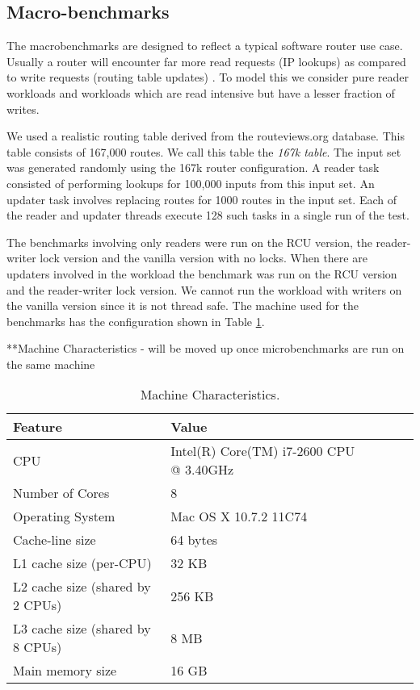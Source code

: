 \subsection{Macro-benchmarks}


The macrobenchmarks are designed to reflect a typical software
router use case. Usually a router will encounter far more read requests
(IP lookups) as compared to write requests (routing table updates)
. To model this we consider pure reader workloads and workloads which are read
intensive but have a lesser fraction of writes.

We used a realistic routing table derived from the routeviews.org
database. This table consists of 167,000 routes. We call this table
the \emph{167k table}. The input set was generated randomly using the 167k router configuration. A reader task consisted of performing lookups for 100,000 inputs from this input set. An updater task involves replacing routes for 1000 routes in the input set. Each of the reader and updater threads execute 128 such tasks in a single run of the test.


 The benchmarks involving only readers were run on the RCU version,
 the reader-writer lock version and the vanilla version with no
 locks. When there are updaters involved in the workload the benchmark was run on the RCU version and the reader-writer lock version. We cannot run the workload with writers on the vanilla version since it is not thread safe.  The machine used for the benchmarks has the configuration shown in Table
 \ref{tbl:machinemac}.


**Machine Characteristics - will be moved up once microbenchmarks are
run on the same machine

\begin{table}
\begin{center}
\begin{tabular}{|l|l|l|l|l|l|}
\hline Feature & Value\\
\hline CPU &Intel(R) Core(TM) i7-2600 CPU @ 3.40GHz\\
\hline Number of Cores & 8\\
\hline Operating System & Mac OS X 10.7.2 11C74\\
\hline Cache-line size & 64 bytes\\
\hline L1 cache size (per-CPU) & 32 KB\\
\hline L2 cache size (shared by 2 CPUs) & 256 KB\\
\hline L3 cache size (shared by 8 CPUs)& 8 MB\\
\hline Main memory size & 16 GB\\
\hline
\end{tabular}
\end{center}
\label{tbl:machinemac}
\caption{Machine Characteristics.}
\end{table}

